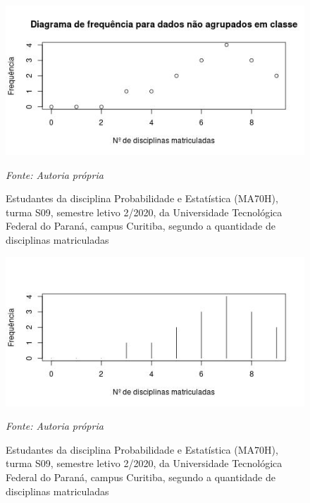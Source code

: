 \begin{enumerate}[label=\emph{\arabic*})]
\begin{enumerate}[label=\emph{\alph*})]
		            \begin{figure}[H]
			            \centering
			            \includegraphics[width=0.7\linewidth]{fig/d-graph-3}
			            \caption{
				            Estudantes da disciplina Probabilidade e Estatística (MA70H), turma S09, semestre  letivo  2/2020,  da  Universidade  Tecnológica  Federal  do  Paraná, campus Curitiba, segundo a quantidade de disciplinas matriculadas
			            }
			            \label{fig:d-graph-3}
			            \begin{minipage}{0.7\linewidth}
				            \emph{Fonte: Autoria própria}
			            \end{minipage}
		            \end{figure}

		            \begin{figure}[H]
			            \centering
			            \includegraphics[width=0.7\linewidth]{fig/d-graph-4}
			            \caption{
				            Estudantes da disciplina Probabilidade e Estatística (MA70H), turma S09, semestre  letivo  2/2020,  da  Universidade  Tecnológica  Federal  do  Paraná, campus Curitiba, segundo a quantidade de disciplinas matriculadas
			            }
			            \label{fig:d-graph-4}
			            \begin{minipage}{0.7\linewidth}
				            \emph{Fonte: Autoria própria}
			            \end{minipage}
		            \end{figure}


\end{enumerate}
\end{enumerate}
